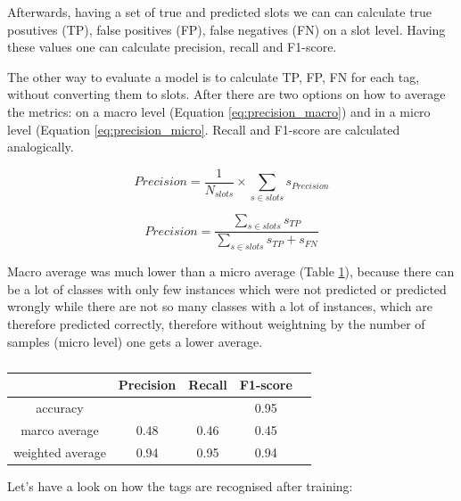 \documentclass[12pt,titlepage,a4paper]{article}
\begin{document}
Afterwards, having a set of true and predicted slots we can can calculate true posutives (TP), false positives (FP), false negatives (FN) on a slot level. Having these values one can calculate precision, recall and F1-score.

The other way to evaluate a model is to calculate TP, FP, FN for each tag, without converting them to slots. After there are two options on how to average the metrics: on a macro level (Equation \ref{eq:precision_macro}) and in a micro level (Equation \ref{eq:precision_micro}. Recall and F1-score are calculated analogically.

\begin{equation}
    Precision = \frac{1}{N_{slots}} \times \sum_{s \in slots}{s_{Precision}}
    \label{eq:precision_macro}
\end{equation}

\begin{equation}
    Precision = \frac{\sum_{s \in slots}{s_{TP}}}{\sum_{s \in slots}{s_{TP} + s_{FN}}}
    \label{eq:precision_micro}
\end{equation}

Macro average was much lower than a micro average (Table \ref{RNNMetrics}), because there can be a lot of classes with only few instances which were not predicted or predicted wrongly while there are not so many classes with a lot of instances, which are therefore predicted correctly, therefore without weight\-ning by the number of samples (micro level) one gets a lower average.

\begin{table}[!h]
    \centering
    \begin{tabular}{ | c | c | c | c | c |}
        \hline
                        & Precision & Recall & F1-score \\
        \hline
        accuracy        &           &        & 0.95 \\
        \hline
        marco average   & 0.48      & 0.46   & 0.45 \\
        \hline
        weighted average& 0.94      & 0.95   & 0.94 \\
        \hline
    \end{tabular}
    \caption{}
    \label{RNNMetrics}
\end{table}

Let's have a look on how the tags are recognised after training: 
\begin{center}
\end{center}
\end{document}
